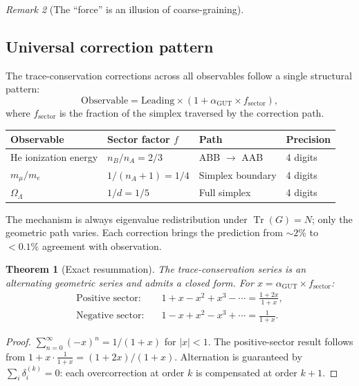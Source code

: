 \documentclass[12pt]{article}
\newtheorem{theorem}{Theorem}[section]
\theoremstyle{remark}
\newtheorem{remark}[theorem]{Remark}
\theoremstyle{definition}
\newcommand{\agut}{\alpha_{\mathrm{GUT}}}
\begin{document}
\begin{remark}[The ``force'' is an illusion of coarse-graining]
\subsection{Universal correction pattern}
\label{sec:universal_correction}

The trace-conservation corrections across all observables follow a single structural pattern:
\begin{equation}
\boxed{\text{Observable} = \text{Leading} \times \left(1 + \alpha_\mathrm{GUT} \times f_\mathrm{sector}\right),}
\end{equation}
where $f_\mathrm{sector}$ is the fraction of the simplex traversed by the correction path.

\begin{center}
\begin{tabular}{llll}
\toprule
Observable & Sector factor $f$ & Path & Precision \\
\midrule
He ionization energy & $n_B/n_A = 2/3$ & ABB $\to$ AAB & 4 digits \\
$m_\mu/m_e$ & $1/(n_A+1) = 1/4$ & Simplex boundary & 4 digits \\
$\Omega_\Lambda$ & $1/d = 1/5$ & Full simplex & 4 digits \\
\bottomrule
\end{tabular}
\end{center}

The mechanism is always eigenvalue redistribution under $\operatorname{Tr}(G) = N$; only the geometric path varies.  Each correction brings the prediction from $\sim\!2\%$ to $<\!0.1\%$ agreement with observation.

\begin{theorem}[Exact resummation]
\label{thm:resummation}
The trace-conservation series is an alternating geometric series and admits a closed form.  For $x = \agut \times f_\mathrm{sector}$:
\begin{align}
\text{Positive sector:}&\quad 1 + x - x^2 + x^3 - \cdots = \frac{1 + 2x}{1 + x}, \\
\text{Negative sector:}&\quad 1 - x + x^2 - x^3 + \cdots = \frac{1}{1 + x}.
\end{align}
\end{theorem}

\begin{proof}
$\sum_{n=0}^{\infty}(-x)^n = 1/(1+x)$ for $|x| < 1$.  The positive-sector result follows from $1 + x \cdot \tfrac{1}{1+x} = (1+2x)/(1+x)$.  Alternation is guaranteed by $\sum_i \delta^{(k)}_i = 0$: each overcorrection at order $k$ is compensated at order $k+1$.
\end{proof}


\end{remark}
\end{document}
